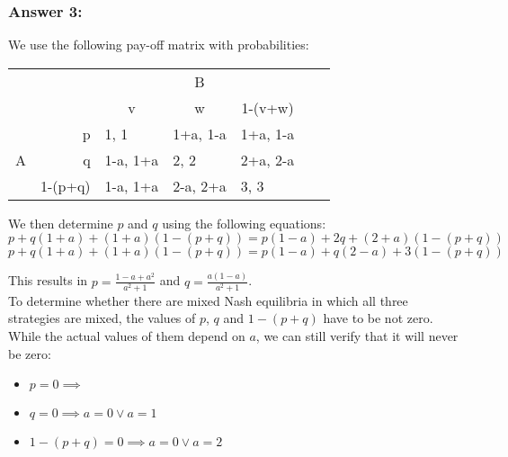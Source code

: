 \documentclass[11pt]{article}
\begin{document}
    \subsubsection{Answer 3:}
    We use the following pay-off matrix with probabilities:

    \begin{table}[h]
        \centering
        \begin{tabular}{lllllll}
            & & \multicolumn{3}{c}{B} & & \\
            &                              & \multicolumn{1}{c}{v}         & \multicolumn{1}{c}{w}         & \multicolumn{1}{c}{1-(v+w)}   & & \\ \cline{3-5}
            \multirow{3}{*}{A} & \multicolumn{1}{r|}{p}       & \multicolumn{1}{l|}{1, 1}     & \multicolumn{1}{l|}{1+a, 1-a} & \multicolumn{1}{l|}{1+a, 1-a} &  &  \\ \cline{3-5}
            & \multicolumn{1}{r|}{q}       & \multicolumn{1}{l|}{1-a, 1+a} & \multicolumn{1}{l|}{2, 2}     & \multicolumn{1}{l|}{2+a, 2-a} & & \\ \cline{3-5}
            & \multicolumn{1}{l|}{1-(p+q)} & \multicolumn{1}{l|}{1-a, 1+a} & \multicolumn{1}{l|}{2-a, 2+a} & \multicolumn{1}{l|}{3, 3} & & \\ \cline{3-5}
        \end{tabular}
    \end{table}

    We then determine $p$ and $q$ using the following equations:
    \begin{equation}
        p+q(1+a)+(1+a)(1-(p+q)) = p(1-a)+2q+(2+a)(1-(p+q))
    \end{equation}
    \begin{equation}
        p+q(1+a)+(1+a)(1-(p+q)) = p(1-a)+q(2-a)+3(1-(p+q))
    \end{equation}

    This results in $p=\frac{1-a+a^2}{a^2+1}$ and $q=\frac{a(1-a)}{a^2+1}$. \\

    To determine whether there are mixed Nash equilibria in which all three strategies are mixed, the values of $p$, $q$ and $1-(p+q)$ have to be not zero. While the actual values of them depend on $a$, we can still verify that it will never be zero:
    \begin{itemize}
        \item $p=0 \implies$ 
        \item $q=0 \implies a=0 \lor a=1$
        \item $1-(p+q)=0 \implies a=0 \lor a=2 $
    \end{itemize}
\end{document}
